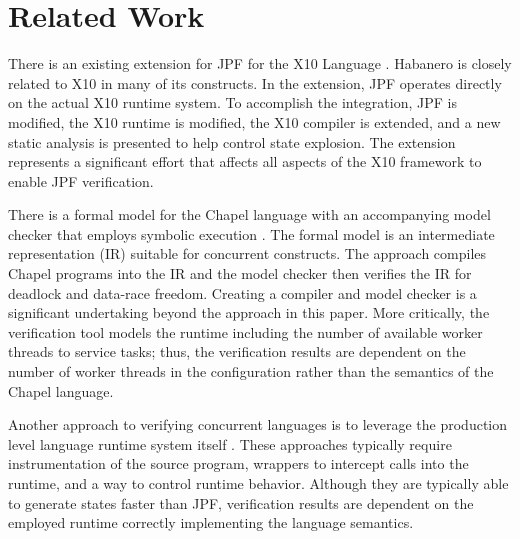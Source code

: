 \section{Related Work}
There is an existing extension for JPF for the X10 Language
\cite{conf:icst:GligoricMM12,x10}. Habanero is closely related to X10 in many of its constructs. In the extension, JPF operates directly on the actual
X10 runtime system. To accomplish the integration, JPF is modified, the X10
runtime is modified, the X10 compiler is extended, and a new static
analysis is presented to help control state explosion. The extension
represents a significant effort that affects all aspects of the X10
framework to enable JPF verification. 

\begin{comment}
The approach in this paper avoids such an
invasive approach by creating a new HJ runtime just for
verification. The X10 extension  does leverage the low overhead of threads
in JPF to create a thread for each task. The VR runtime system uses
the same approach.
\end{comment}

There is a formal model for the Chapel language with an accompanying
model checker that employs symbolic execution \cite{chapel}. The
formal model is an intermediate representation (IR) suitable for
concurrent constructs. The approach compiles Chapel programs into the
IR and the model checker then verifies the IR for deadlock and
data-race freedom. Creating a compiler and model checker is a
significant undertaking beyond the approach in this paper. More
critically, the verification tool models the runtime including the
number of available worker threads to service tasks; thus, the
verification results are dependent on the number of worker threads in
the configuration rather than the semantics of the Chapel language. 

\begin{comment}
In this paper, correctness is a property of the HJ language semantics
with the given HJ program and not any aspect of the runtime
implementation. Verifying the HJ runtime system implements HJ semantics
is a verification problem separate from verifying that an HJ program
is data-race free.
\end{comment}

Another approach to verifying concurrent languages is to leverage the
production level language runtime system itself
\cite{Vakkalanka:2008:DVM:1427782.1427794,Vo:2009:FVP:1594835.1504214,5644885,6113841}. These
approaches typically require instrumentation of the source program,
wrappers to intercept calls into the runtime, and a way to control
runtime behavior. Although they are typically able to generate states
faster than JPF, verification results are dependent on the employed
runtime correctly implementing the language semantics. 

